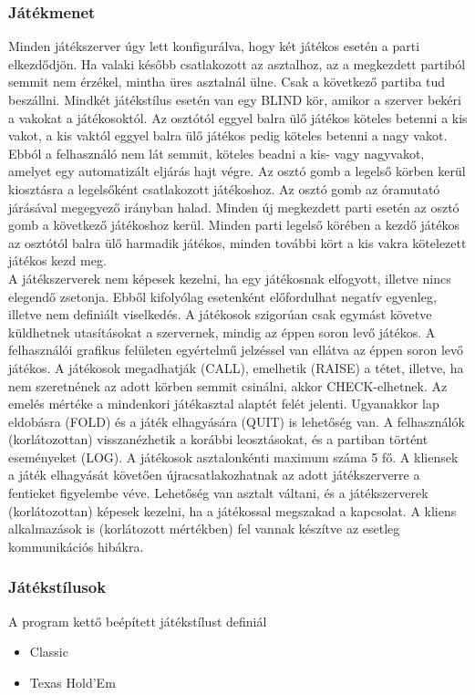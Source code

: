 \subsubsection{Játékmenet}
Minden játékszerver úgy lett konfigurálva, hogy két játékos esetén a parti elkezdődjön. Ha valaki később csatlakozott az asztalhoz, az a megkezdett partiból semmit nem érzékel, mintha üres asztalnál ülne. Csak a következő partiba tud beszállni. Mindkét játékstílus esetén van egy BLIND kör, amikor a szerver bekéri a vakokat a játékosoktól. Az osztótól eggyel balra ülő játékos köteles betenni a kis vakot, a kis vaktól eggyel balra ülő játékos pedig köteles betenni a nagy vakot. Ebból a felhasználó nem lát semmit, köteles beadni a kis- vagy nagyvakot, amelyet egy automatizált eljárás hajt végre. Az osztó gomb  a legelső körben kerül kiosztásra a legelsőként csatlakozott játékoshoz. Az osztó gomb az óramutató járásával megegyező irányban halad. Minden új megkezdett parti esetén az osztó gomb a következő játékoshoz kerül. Minden parti legelső körében a kezdő játékos az osztótól balra ülő harmadik játékos, minden további kört a kis vakra kötelezett játékos kezd meg.  \\
A játékszerverek nem képesek kezelni, ha egy játékosnak elfogyott, illetve nincs elegendő zsetonja. Ebből kifolyólag esetenként előfordulhat negatív egyenleg, illetve nem definiált viselkedés. A játékosok szigorúan csak egymást követve küldhetnek utasításokat a szervernek, mindig az éppen soron levő játékos. A felhasználói grafikus felületen egyértelmű jelzéssel van ellátva az éppen soron levő játékos. A játékosok megadhatják (CALL), emelhetik (RAISE) a tétet, illetve, ha nem szeretnének az adott körben semmit csinálni, akkor CHECK-elhetnek. Az emelés mértéke a mindenkori játékasztal alaptét felét jelenti. Ugyanakkor lap eldobásra (FOLD) és a játék elhagyására (QUIT) is lehetőség van. A felhasználók (korlátozottan) visszanézhetik a korábbi leosztásokat, és a partiban történt eseményeket (LOG). A játékosok asztalonkénti maximum száma 5 fő. A kliensek a játék elhagyását követően újracsatlakozhatnak az adott játékszerverre a fentieket figyelembe véve. Lehetőség van asztalt váltani, és a játékszerverek (korlátozottan) képesek kezelni, ha a játékossal megszakad a kapcsolat. A kliens alkalmazások is (korlátozott mértékben) fel vannak készítve az esetleg kommunikációs hibákra.
\subsubsection{Játékstílusok} \label{subsubsec:game_styles}
A program kettő beépített játékstílust definiál
\begin{itemize}[leftmargin=2cm]
\item Classic \cite{five_card_draw}
\item Texas Hold'Em \cite{texas_holdem}
\end{itemize}

